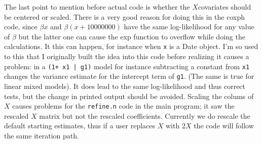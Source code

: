 \documentclass{article}
\begin{document}
The last point to mention before actual code is whether the $X$covariates should
be centered or scaled.  There is a very good reason for doing this in the
coxph code, since $\beta x$ and $\beta (x+ 10000000)$ have the same log-likelihood 
for any value of $\beta$ but the latter one can cause the exp function to overflow
while doing the calculations.  It this can happen, for instance when \Verb!x! is a
Date object.  I'm so used to this that I originally built the idea into this code
before realizing it causes a problem: in a \Verb!(1+ x1 | g1)! model for instance
subtracting a constant from \Verb!x1! changes the variance estimate for the
intercept term of \Verb!g1!.
(The same is true for linear mixed models).
It does lead to the same log-likelihood and thus correct tests, but the
change in printed output should be avoided.
Scaling the colums of $X$ causes problems for
the \Verb!refine.n! code in the main program; it saw the rescaled
$X$ matrix but not the rescaled coefficients.  
Currently we do rescale the default starting estimates, thus if a user replaces
$X$ with $2X$ the code will follow the same iteration path.
\end{document}
